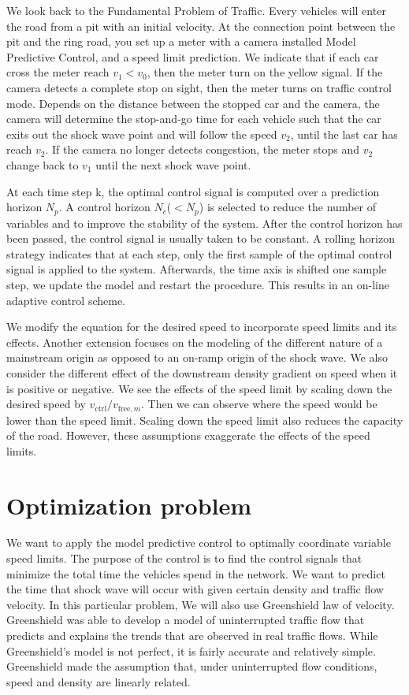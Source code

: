 \documentclass{article}
\begin{document}
We look back to the Fundamental Problem of Traffic. Every vehicles will enter the road from a pit with an initial velocity. At the connection point between the pit and the ring road, you set up a meter with a camera installed Model Predictive Control, and a speed limit prediction. We indicate that if each car cross the meter reach $v_1<v_0$, then the meter turn on the yellow signal. If the camera detects a complete stop on sight, then the meter turns on traffic control mode. Depends on the distance between the stopped car and the camera, the camera will determine the stop-and-go time for each vehicle such that the car exits out the shock wave point and will follow the speed $v_2$, until the last car has reach $v_2$. If the camera no longer detects congestion, the meter stops and $v_2$ change back to $v_1$ until the next shock wave point.

At each time step k, the optimal control signal is computed over a prediction horizon $N_p$. A control horizon $N_c$($< N_p$) is selected to reduce the number of variables and to improve the stability of the system. After the control horizon has been passed, the control signal is usually taken to be constant.  A rolling horizon strategy indicates that at each step, only the first sample of the optimal control signal is applied to the system. Afterwards, the time axis is shifted one sample step, we update the model and restart the procedure. This results in an on-line adaptive control scheme.

We modify the equation for the desired speed to incorporate speed limits and its effects. Another extension focuses on the modeling of the different nature of a mainstream origin as opposed to an on-ramp origin of the shock wave. We also consider the different effect of the downstream density gradient on speed when it is positive or negative. We see the effects of the speed limit by scaling down the desired speed by $v_{\text{ctrl}}/v_{\text{free},m}$. Then we can observe where the speed would be lower than the speed limit. Scaling down the speed limit also reduces the capacity of the road. However, these assumptions exaggerate the effects of the speed limits.
\section*{Optimization problem}
We want to apply the model predictive control to optimally coordinate variable speed limits. The purpose of the control is to find the control signals that minimize the total time the vehicles spend in the network. We want to predict the time that shock wave will occur with given certain density and traffic flow velocity. In this particular problem, We will also use Greenshield law of velocity. Greenshield was able to develop a model of uninterrupted traffic flow that predicts and explains the trends that are observed in real traffic flows. While Greenshield’s model is not perfect, it is fairly accurate and relatively simple. Greenshield made the assumption that, under uninterrupted flow conditions, speed and density are linearly related.
\end{document}
